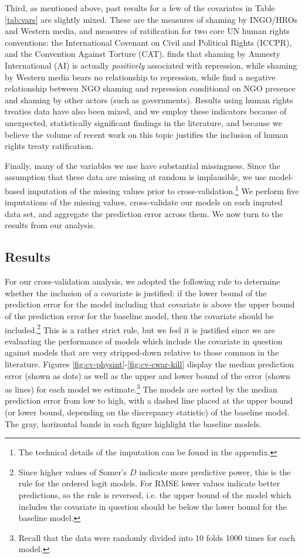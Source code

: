 \documentclass[12pt]{article}
\begin{document}
Third, as mentioned above, past results for a few of the covariates in Table \ref{tab:vars} are slightly mixed. These are the measures of shaming by INGO/HROs and Western media, and measures of ratification for two core UN human rights conventions: the International Covenant on Civil and Political Rights (ICCPR), and the Convention Against Torture (CAT). \citet{HafnerBurton2008} finds that shaming by Amnesty International (AI) is actually {\it positively} associated with repression, while shaming by Western media bears no relationship to repression, while \citet{MurdieDavis2012} find a negative relationship between NGO shaming and repression conditional on NGO presence and shaming by other actors (such as governments). Results using human rights treaties data have also been mixed, and we employ these indicators because of unexpected, statistically significant findings in the literature, and because we believe the volume of recent work on this topic justifies the inclusion of human rights treaty ratification. 

Finally, many of the variables we use have substantial missingness. Since the assumption that these data are missing at random is implausible, we use model-based imputation of the missing values prior to cross-validation.\footnote{The technical details of the imputation can be found in the appendix.} We perform five imputations of the missing values, cross-validate our models on each imputed data set, and aggregate the prediction error across them. We now turn to the results from our analysis.

\subsection{Results}

For our cross-validation analysis, we adopted the following rule to determine whether the inclusion of a covariate is justified: if the lower bound of the prediction error for the model including that covariate is above the upper bound of the prediction error for the baseline model, then the covariate should be included.\footnote{Since higher values of Somer's $D$ indicate more predictive power, this is the rule for the ordered logit models. For RMSE lower values indicate better predictions, so the rule is reversed, i.e. the upper bound of the model which includes the covariate in question should be below the lower bound for the baseline model.} This is a rather strict rule, but we feel it is justified since we are evaluating the performance of models which include the covariate in question against models that are very stripped-down relative to those common in the literature. Figures \ref{fig:cv-physint}-\ref{fig:cv-cwar-kill} display the median prediction error (shown as dots) as well as the upper and lower bound of the error (shown as lines) for each model we estimate.\footnote{Recall that the data were randomly divided into 10 folds 1000 times for each model.} The models are sorted by the median prediction error from low to high, with a dashed line placed at the upper bound (or lower bound, depending on the discrepancy statistic) of the baseline model. The gray, horizontal bands in each figure highlight the baseline models. 
\end{document}
